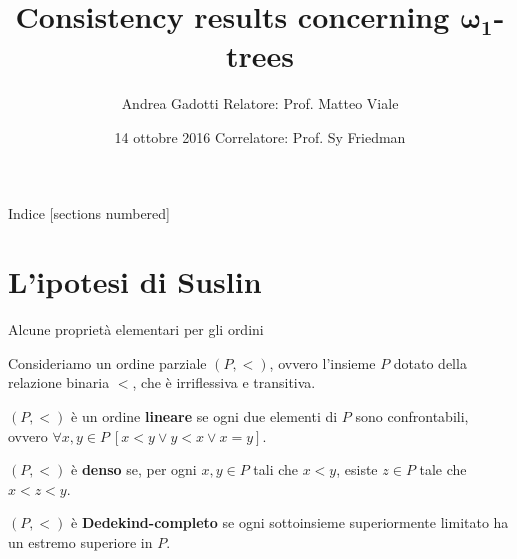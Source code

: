 \documentclass{beamer}
\title{Consistency results concerning $\pmb{\omega_1}$-trees}
\author{Andrea Gadotti \hfill Relatore: Prof. Matteo Viale}
\date{14 ottobre 2016 \hfill Correlatore: Prof. Sy Friedman}
\institute{Università di Torino}
\theoremstyle{num.custom-title}
\theoremstyle{custom-title}
\renewcommand{\emph}[1]{\textbf{#1}}
\begin{document}
\setlength{\abovedisplayskip}{1pt}
\setlength{\belowdisplayskip}{1pt}
\setlength{\abovedisplayshortskip}{1pt}
\setlength{\belowdisplayshortskip}{1pt}

\maketitle


\begin{frame}{Indice}
[sections numbered]
\tableofcontents[hideallsubsections]
\end{frame}


\section{L'ipotesi di Suslin}

\begin{frame}{Alcune proprietà elementari per gli ordini}

Consideriamo un ordine parziale $(P,<)$, ovvero l'insieme $P$ dotato della relazione binaria $<$, che è irriflessiva e transitiva.

\begin{definition}
$(P,<)$ è un ordine \emph{lineare} se ogni due elementi di $P$ sono confrontabili, ovvero $\forall x,y \in P \ [x<y \vee y<x \vee x=y]$.
\end{definition}

\begin{definition}
$(P,<)$ è \emph{denso} se, per ogni $x,y \in P$ tali che $x<y$, esiste $z \in P$ tale che $x < z < y$.
\end{definition}

\begin{definition}
$(P,<)$ è \emph{Dedekind-completo} se ogni sottoinsieme superiormente limitato ha un estremo superiore in $P$.
\end{definition}

\end{frame}
\end{document}
